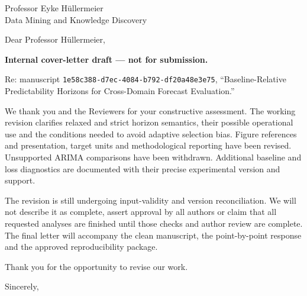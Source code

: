 \documentclass[11pt,a4paper]{letter}
\date{1 October 2026}
\begin{document}
\begin{letter}{Professor Eyke H\"ullermeier\\Data Mining and Knowledge Discovery}
\opening{Dear Professor H\"ullermeier,}
\textbf{Internal cover-letter draft --- not for submission.}

Re: manuscript \nolinkurl{1e58c388-d7ec-4084-b792-df20a48e3e75},
``Baseline-Relative Predictability Horizons for Cross-Domain Forecast Evaluation.''

We thank you and the Reviewers for your constructive assessment. The working
revision clarifies relaxed and strict horizon semantics, their possible
operational use and the conditions needed to avoid adaptive selection bias.
Figure references and presentation, target units and methodological reporting
have been revised. Unsupported ARIMA comparisons have been withdrawn.
Additional baseline and loss diagnostics are documented with their precise
experimental version and support.

The revision is still undergoing input-validity and version reconciliation.
We will not describe it as complete, assert approval by all authors or claim
that all requested analyses are finished until those checks and author review
are complete. The final letter will accompany the clean manuscript, the
point-by-point response and the approved reproducibility package.

Thank you for the opportunity to revise our work.
\closing{Sincerely,}
\end{letter}
\end{document}
